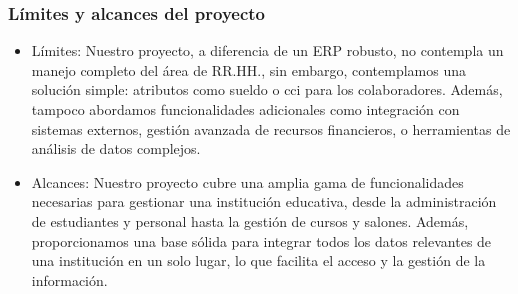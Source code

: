 \subsubsection{Límites y alcances del proyecto}
\begin{itemize}
	\item Límites: Nuestro proyecto, a diferencia de un ERP robusto, no contempla un manejo completo del área de RR.HH., sin embargo, contemplamos una solución simple: atributos como sueldo o cci para los colaboradores. Además, tampoco abordamos funcionalidades adicionales como integración con sistemas externos, gestión avanzada de recursos financieros, o herramientas de análisis de datos complejos.
	\item Alcances: Nuestro proyecto cubre una amplia gama de funcionalidades necesarias para gestionar una institución educativa, desde la administración de estudiantes y personal hasta la gestión de cursos y salones. Además, proporcionamos una base sólida para integrar todos los datos relevantes de una institución en un solo lugar, lo que facilita el acceso y la gestión de la información.
\end{itemize}
